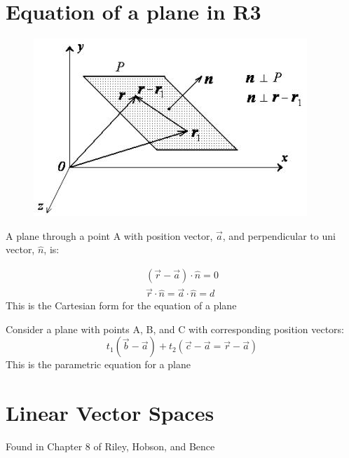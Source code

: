 \documentclass[a4paper, 11pt, normalem]{report}
\begin{document}
\section{Equation of a plane in R3}
\begin{figure}
    \vspace{-20pt}
    \begin{center}
        \includegraphics[scale=0.6]{Plane.jpg}
    \end{center}
    \vspace{-80pt}
\end{figure}
A plane through a point A with position vector, $\vec{a}$, and perpendicular to uni vector, $\hat{n}$, is:

\begin{gather*}
    (\vec{r} - \vec{a}) \cdot \hat{n} = 0 \\
    \vec{r} \cdot \hat{n} = \vec{a} \cdot \hat{n} = d
\end{gather*}
This is the Cartesian form for the equation of a plane

Consider a plane with points A, B, and C with corresponding position vectors:
\begin{equation*}
    t_{1}(\vec{b} - \vec{a}) + t_{2}(\vec{c} - \vec{a} = \vec{r} - \vec{a})
\end{equation*}
This is the parametric equation for a plane

\section{Linear Vector Spaces}
Found in Chapter 8 of Riley, Hobson, and Bence
\end{document}
